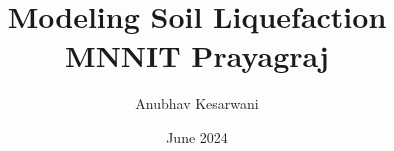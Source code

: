 \documentclass{report}
\title{Modeling Soil Liquefaction\\
{\small MNNIT Prayagraj}}
\author{Anubhav Kesarwani}
\date{June 2024}
\begin{document}
\ifx\isPandoc\undefined
\maketitle
\fi

\tableofcontents




\end{document}
